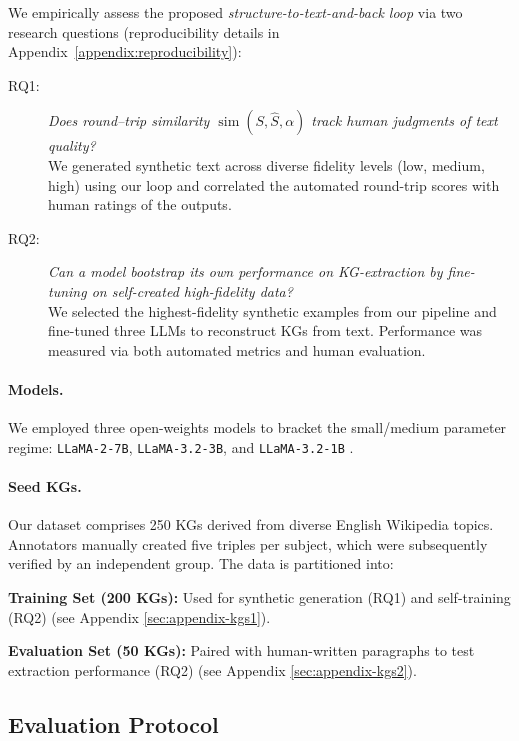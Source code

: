 \documentclass[11pt]{article}
\begin{document}
We empirically assess the proposed \emph{structure-to-text-and-back loop} via two research questions (reproducibility details in Appendix~\ref{appendix:reproducibility}):

\begin{description}
\item[RQ1:] \emph{Does round–trip similarity \(\operatorname{sim}(S,\hat S, \alpha)\) track human judgments of text quality?} \\
We generated synthetic text across diverse fidelity levels (low, medium, high) using our loop and correlated the automated round-trip scores with human ratings of the outputs.

\item[RQ2:] \emph{Can a model bootstrap its own performance on KG-extraction by fine-tuning on self-created high-fidelity data?} \\
We selected the highest-fidelity synthetic examples from our pipeline and fine-tuned three LLMs to reconstruct KGs from text. Performance was measured via both automated metrics and human evaluation.
\end{description}

\paragraph{Models.}
We employed three open-weights models to bracket the small/medium parameter regime: \texttt{LLaMA-2-7B}, \texttt{LLaMA-3.2-3B}, and \texttt{LLaMA-3.2-1B} \citep{touvron2023llama, touvron2023llama2}.

\paragraph{Seed KGs.}
Our dataset comprises 250 KGs derived from diverse English Wikipedia topics. Annotators manually created five triples per subject, which were subsequently verified by an independent group. The data is partitioned into:

\textbf{Training Set (200 KGs):} Used for synthetic generation (RQ1) and self-training (RQ2) (see Appendix \ref{sec:appendix-kgs1}).

\textbf{Evaluation Set (50 KGs):} \label{sec:eval_data} Paired with human-written paragraphs to test extraction performance (RQ2) (see Appendix \ref{sec:appendix-kgs2}).

\subsection{Evaluation Protocol}
\label{ssec:evaluation}
\end{document}
